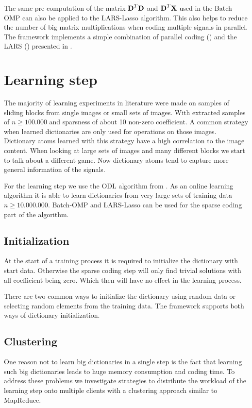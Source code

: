 The same pre-computation of the matrix $\boldsymbol{\mathrm{D}}^T\boldsymbol{\mathrm{D}}$ and
$\boldsymbol{\mathrm{D}}^T\boldsymbol{\mathrm{X}}$ used in the Batch-OMP can also be applied to the LARS-Lasso
algorithm. This also helps to reduce the number of big matrix multiplications
when coding multiple signals in parallel. The framework implements a simple
combination of parallel coding () and the
LARS () presented in .

\section{Learning step}
The majority of learning experiments in literature were made on
samples of sliding blocks from single images or small sets of images.
With extracted samples of $n \ge 100.000$ and sparsness of about 10 non-zero
coefficient. A common strategy when learned dictionaries are only used for
operations on those images. Dictionary atoms learned with this strategy 
have a high correlation to the image content. 
When looking at large sets of images and many different blocks we start to talk
about a different game. Now dictionary atoms tend to capture more
general information of the signals.

For the learning step we use the ODL algorithm from . As
an online learning algorithm it is able to learn dictionaries from very large
sets of training data $n\ge 10.000.000$. Batch-OMP and LARS-Lasso can be used
for the sparse coding part of the algorithm.


\subsection{Initialization}
At the start of a training process it is required to initialize the
dictionary with start data. Otherwise the sparse coding step will only find
trivial solutions with all coefficient being zero. Which then will have no
effect in the learning process.

There are two common ways to initialize the dictionary using random data or
selecting random elements from the training data. The framework supports 
both ways of dictionary initialization. 


\subsection{Clustering}
\label{sec:clustering}
One reason not to learn big dictionaries in a single step is the fact that
learning such big dictionaries leads to huge memory consumption and coding time.
To address these problems we investigate strategies to distribute the workload
of the learning step onto multiple clients with a clustering approach similar to
MapReduce. 

